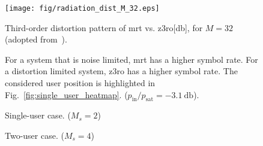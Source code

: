 \documentclass[conference]{IEEEtran}
\newcommand{\zero}[0]{\gls{z3ro}\xspace}
\newcommand{\zerop}[0]{\zero precoder\xspace}
\newcommand{\mrt}[0]{\gls{mrt}\xspace}
\begin{document}
\begin{figure}[H]
    \centering
    \texttt{[image: fig/radiation\_dist\_M\_32.eps]}%
    \caption{\small Third-order distortion pattern of \mrt vs. \zero [\si{\decibel}], for $M=32$ (adopted from~\cite{z3ro}).}%
    \label{fig:radiation}
\end{figure}

%   


\begin{figure}[!htb]\centering
  
  \caption{\small For a system that is noise limited, \mrt has a higher symbol rate. For a distortion limited system, \zero has a higher symbol rate. The considered user position is highlighted in Fig.~\ref{fig:single_user_heatmap}. ($p_{\mathrm{in}}/p_{\mathrm{sat}}=\SI{-3.1}{\decibel}$).}
  \label{fig:r}
\end{figure}


\begin{figure*}
     \centering
     \begin{subfigure}[b]{0.48\linewidth}
         \centering
         
  \caption{\footnotesize Single-user case. ($M_s=2$)}
  \label{fig:single_user_cdf}
     \end{subfigure}
     \hfill
     \begin{subfigure}[b]{0.48\textwidth}
         \centering
         
  \caption{\footnotesize Two-user case. ($M_s=4$)}
  \label{fig:2_user_cdf}
     \end{subfigure}
        \caption{\small \Gls{ecdf} of the distortion level for the single and multi-user case. The  distortion level at all possible user locations (solid) and at all user and observer locations (dashed) for \mrt and \zero precoding. In both scenarios, the \zerop reduces both the distortion at the user location (solid) and the maximum experienced distortion at the observer locations (dashed). ($p_{\mathrm{in}}/p_{\mathrm{sat}}$ = \SI{-3.1}{\decibel})}
        \label{fig:distortion_cdf}
\end{figure*}
 
\end{document}
